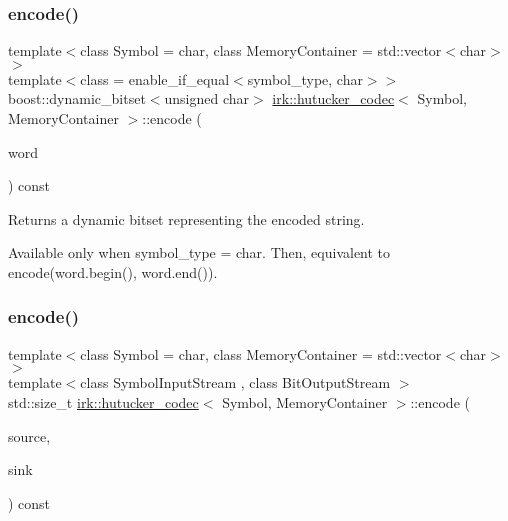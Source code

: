 \subsubsection{\texorpdfstring{encode()}{encode()}\hspace{0.1cm}{\footnotesize\ttfamily [2/3]}}
{\footnotesize\ttfamily template$<$class Symbol  = char, class Memory\+Container  = std\+::vector$<$char$>$$>$ \\
template$<$class  = enable\+\_\+if\+\_\+equal$<$symbol\+\_\+type, char$>$$>$ \\
boost\+::dynamic\+\_\+bitset$<$unsigned char$>$ \mbox{\hyperlink{classirk_1_1hutucker__codec}{irk\+::hutucker\+\_\+codec}}$<$ Symbol, Memory\+Container $>$\+::encode (\begin{DoxyParamCaption}\item[{const std\+::string \&}]{word }\end{DoxyParamCaption}) const\hspace{0.3cm}{\ttfamily [inline]}}



Returns a dynamic bitset representing the encoded string. 

Available only when {\ttfamily symbol\+\_\+type = char}. Then, equivalent to {\ttfamily encode(word.\+begin(), word.\+end())}. \mbox{\label{classirk_1_1hutucker__codec_a3f0df69a4d865e5f1e89e90b4f250dae}} 
\subsubsection{\texorpdfstring{encode()}{encode()}\hspace{0.1cm}{\footnotesize\ttfamily [3/3]}}
{\footnotesize\ttfamily template$<$class Symbol  = char, class Memory\+Container  = std\+::vector$<$char$>$$>$ \\
template$<$class Symbol\+Input\+Stream , class Bit\+Output\+Stream $>$ \\
std\+::size\+\_\+t \mbox{\hyperlink{classirk_1_1hutucker__codec}{irk\+::hutucker\+\_\+codec}}$<$ Symbol, Memory\+Container $>$\+::encode (\begin{DoxyParamCaption}\item[{Symbol\+Input\+Stream \&}]{source,  }\item[{Bit\+Output\+Stream \&}]{sink }\end{DoxyParamCaption}) const\hspace{0.3cm}{\ttfamily [inline]}}



